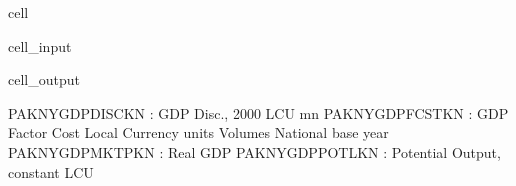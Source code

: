 \documentclass[letterpaper,10pt,english]{jupyterBook}
\begin{document}
\begin{sphinxuseclass}{cell}\begin{sphinxVerbatimInput}

\begin{sphinxuseclass}{cell_input}
\begin{sphinxVerbatim}[commandchars=\\\{\}]
\PYG{p}{[}\PYG{p}{]}
\end{sphinxVerbatim}

\end{sphinxuseclass}\end{sphinxVerbatimInput}
\begin{sphinxVerbatimOutput}

\begin{sphinxuseclass}{cell_output}
\begin{sphinxVerbatim}[commandchars=\\\{\}]
PAKNYGDPDISCKN : GDP Disc., 2000 LCU mn
PAKNYGDPFCSTKN : GDP Factor Cost Local Currency units Volumes National base year
PAKNYGDPMKTPKN : Real GDP
PAKNYGDPPOTLKN : Potential Output, constant LCU
\end{sphinxVerbatim}

\end{sphinxuseclass}\end{sphinxVerbatimOutput}

\end{sphinxuseclass}
\end{document}
